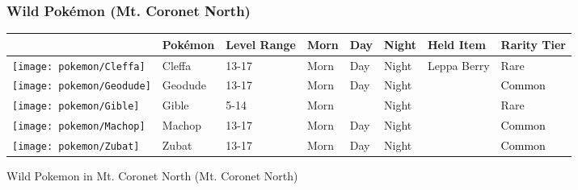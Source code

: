\subsubsection{Wild Pokémon (Mt. Coronet North)}%
\label{ssubsec:WildPokmon(Mt.CoronetNorth)}%
\begin{longtable}{||l l l l l l l l||}%
\hline%
\rowcolor{gray}%
&Pokémon&Level Range&Morn&Day&Night&Held Item&Rarity Tier\\%
\hline%
\endhead%
\hline%
\rowcolor{gray}%
\texttt{[image: pokemon/Cleffa]}&Cleffa&13{-}17&Morn&Day&Night&Leppa Berry&\textcolor{RedOrange}{%
Rare%
}\\%
\hline%
\rowcolor{gray}%
\texttt{[image: pokemon/Geodude]}&Geodude&13{-}17&Morn&Day&Night&&\textcolor{black}{%
Common%
}\\%
\hline%
\rowcolor{gray}%
\texttt{[image: pokemon/Gible]}&Gible&5{-}14&Morn&&Night&&\textcolor{RedOrange}{%
Rare%
}\\%
\hline%
\rowcolor{gray}%
\texttt{[image: pokemon/Machop]}&Machop&13{-}17&Morn&Day&Night&&\textcolor{black}{%
Common%
}\\%
\hline%
\rowcolor{gray}%
\texttt{[image: pokemon/Zubat]}&Zubat&13{-}17&Morn&Day&Night&&\textcolor{black}{%
Common%
}\\%
\hline%
\end{longtable}%
\caption{Wild Pokemon in Mt. Coronet North (Mt. Coronet North)}